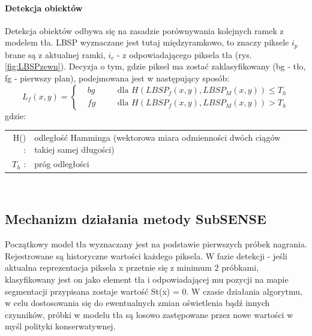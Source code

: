 \paragraph{Detekcja obiektów \\}
Detekcja obiektów odbywa się na zasadzie porównywania kolejnych ramek z modelem tła. LBSP wyznaczane jest tutaj międzyramkowo, to znaczy piksele $i_{p}$ brane są z aktualnej ramki, $i_{c}$ - z odpowiadającego piksela tła (rys. \ref{fig:LBSPzewn}). Decyzja o tym, gdzie piksel ma zostać zaklasyfikowany (bg - tło, fg - pierwszy plan), podejmowana jest w następujący sposób:
\begin{equation}
L_{f}(x,y)=\left\{
\begin{split}
&bg & \quad &\text{dla $H(LBSP_{f}(x,y),LBSP_{M}(x,y))\leq T_{h}$} \\
&fg & \quad &\text{dla $H(LBSP_{f}(x,y),LBSP_{M}(x,y))>T_{h}$}
\end{split}
\right.
\end{equation}
gdzie:\\ 
\hspace*{3em}
\begin{tabular}{r l}
H() : &  odległość Hamminga (wektorowa miara odmienności dwóch ciągów takiej samej długości)\\
$T_{h}$ : & próg odległości\\
\end{tabular} \\

\subsection{Mechanizm działania metody SubSENSE}
Początkowy model tła wyznaczany jest na podstawie pierwszych próbek nagrania. Rejestrowane są historyczne wartości każdego piksela. W fazie detekcji - jeśli aktualna reprezentacja piksela x przetnie się z minimum 2 próbkami, klasyfikowany jest on jako element tła i odpowiadającej mu pozycji na mapie segmentacji przypisana zostaje wartość St(x) = 0. W czasie działania algorytmu, w celu dostosowania się do ewentualnych zmian oświetlenia bądź innych czynników, próbki w modelu tła są losowo zastępowane przez nowe wartości w myśl polityki konserwatywnej.
